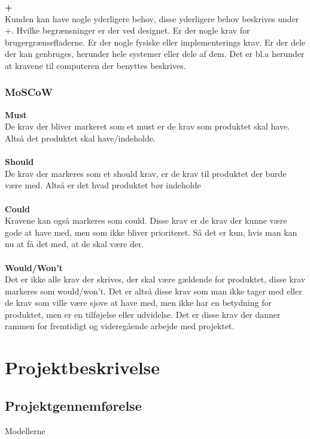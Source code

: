 \textbf{+}\\
Kunden kan have nogle yderligere behov, disse yderligere behov beskrives under +. Hvilke begrænsninger er der ved designet. Er der nogle krav for brugergrænsefladerne. Er der nogle fysiske eller implementerings krav. Er der dele der kan genbruges, herunder hele systemer eller dele af dem. Det er bl.a herunder at kravene til computeren der benyttes beskrives. \cite{furps}\\


\subsection{MoSCoW}
\textbf{Must}\\
De krav der bliver markeret som et must er de krav som produktet skal have. Altså det produktet skal have/indeholde.\\\\
\textbf{Should}\\
De krav der markeres som et should krav, er de krav til produktet der burde være med. Altså er det hvad produktet bør indeholde\\\\
\textbf{Could}\\
Kravene kan også markeres som could. Disse krav er de krav der kunne være gode at have med, men som ikke bliver prioriteret. Så det er kun, hvis man kan nu at få det med, at de skal være der.\\\\
\textbf{Would/Won't}\\
Det er ikke alle krav der skrives, der skal være gældende for produktet, disse krav markeres som would/won't. Det er altså disse krav som man ikke tager med eller de krav som ville være sjove at have med, men ikke har en betydning for produktet, men er en tilføjelse eller udvidelse. Det er disse krav der danner rammen for fremtidigt og videregående arbejde med projektet.
\chapter{Projektbeskrivelse}
\section{Projektgennemførelse}
Modellerne
